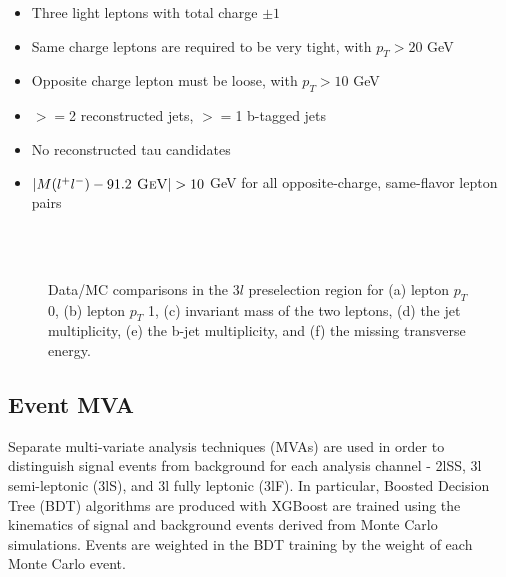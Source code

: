 \begin{itemize}
  \item Three light leptons with total charge $\pm 1$
  \item Same charge leptons are required to be very tight, with $p_T > 20$ GeV
  \item Opposite charge lepton must be loose, with $p_T > 10$ GeV
  \item $>=$2 reconstructed jets, $>=$1 b-tagged jets                                                                        
  \item No reconstructed tau candidates
  \item $|M(l^+l^-)-91.2\textsc{ GeV}| > 10$ GeV for all opposite-charge, same-flavor lepton pairs
\end{itemize}

\begin{figure}[H]
    \\                             
    \\                         
    \caption{Data/MC comparisons in the $3l$ preselection region for (a) lepton $p_T$ 0, (b) lepton $p_T$ 1, (c) invariant mass of the two leptons, (d) the jet multiplicity, (e) the b-jet multiplicity, and (f) the missing transverse energy.}
    \label{fig:presel3l}                                                                                          
\end{figure}


\subsection{Event MVA}
\label{subsec:sigBkgMVA}

Separate multi-variate analysis techniques (MVAs) are used in order to distinguish signal events from background for each analysis channel - 2lSS, 3l semi-leptonic (3lS), and 3l fully leptonic (3lF). In particular, Boosted Decision Tree (BDT) algorithms are produced with XGBoost \cite{xgboost} are trained using the kinematics of signal and background events derived from Monte Carlo simulations. Events are weighted in the BDT training by the weight of each Monte Carlo event. 

